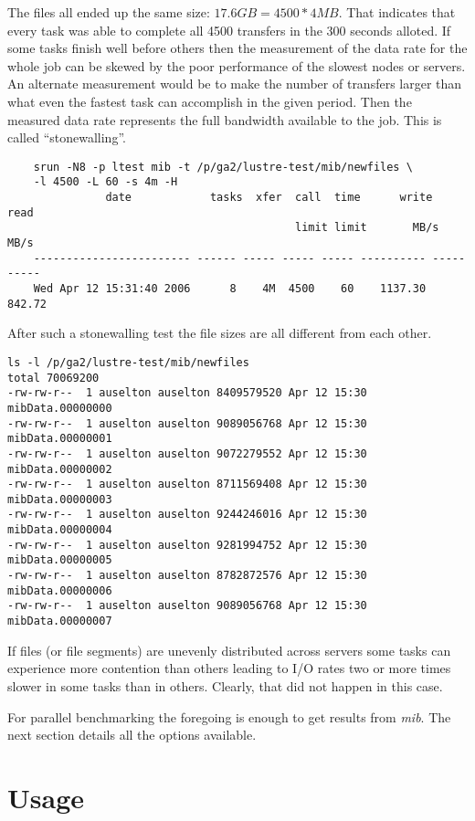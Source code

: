 \documentclass{article}
\begin{document}
The files all ended up the same size: $17.6GB = 4500 * 4MB$.  That
indicates that every task was able to complete all 4500 transfers in
the 300 seconds alloted.  If some tasks finish well before others then
the measurement of the data rate for the whole job can be skewed by
the poor performance of the slowest nodes or servers.  An alternate
measurement would be to make the number of transfers larger than what
even the fastest task can accomplish in the given period.  Then the
measured data rate represents the full bandwidth available to the job.
This is called ``stonewalling''.  
{\small
  \begin{verbatim}
    srun -N8 -p ltest mib -t /p/ga2/lustre-test/mib/newfiles \
    -l 4500 -L 60 -s 4m -H
               date            tasks  xfer  call  time      write       read
                                            limit limit       MB/s       MB/s
    ------------------------ ------ ----- ----- ----- ---------- ----------
    Wed Apr 12 15:31:40 2006      8    4M  4500    60    1137.30     842.72
  \end{verbatim}
}
After such a stonewalling test the file sizes are all different
from each other. 
{\small
  \begin{verbatim}
ls -l /p/ga2/lustre-test/mib/newfiles
total 70069200
-rw-rw-r--  1 auselton auselton 8409579520 Apr 12 15:30 mibData.00000000
-rw-rw-r--  1 auselton auselton 9089056768 Apr 12 15:30 mibData.00000001
-rw-rw-r--  1 auselton auselton 9072279552 Apr 12 15:30 mibData.00000002
-rw-rw-r--  1 auselton auselton 8711569408 Apr 12 15:30 mibData.00000003
-rw-rw-r--  1 auselton auselton 9244246016 Apr 12 15:30 mibData.00000004
-rw-rw-r--  1 auselton auselton 9281994752 Apr 12 15:30 mibData.00000005
-rw-rw-r--  1 auselton auselton 8782872576 Apr 12 15:30 mibData.00000006
-rw-rw-r--  1 auselton auselton 9089056768 Apr 12 15:30 mibData.00000007
  \end{verbatim}
}
If files (or file segments) are unevenly distributed across servers
some tasks can experience more contention than others leading to I/O
rates two or more times slower in some tasks than in others.  Clearly, that
did not happen in this case.

For parallel benchmarking the foregoing is enough to get results from
{\em mib}.  The next section details all the options available.  

\section{Usage}\label{section.usage} 
\end{document}
